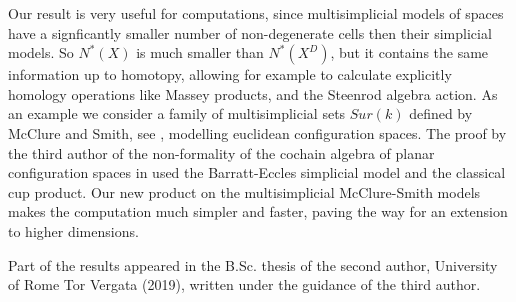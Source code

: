  Our result is very useful for computations, since multisimplicial models of spaces have a signficantly smaller number of non-degenerate cells then their simplicial models.
So $N^*(X)$ is much smaller than $N^*(X^D)$, but it contains the same information up to homotopy, 
allowing for example 
to calculate explicitly homology operations like Massey products, and the Steenrod algebra action. 
As an example we consider a family of multisimplicial sets $Sur(k)$ defined  by McClure and Smith, see \cite{MS},  modelling euclidean configuration spaces.
The proof by the third author of the non-formality of the cochain algebra of planar configuration spaces in \cite{formality}  used the Barratt-Eccles simplicial model and the classical cup product.
Our new product on the multisimplicial McClure-Smith models makes the computation much simpler and faster, paving the way for an extension to higher dimensions. 

\medskip

Part of the results appeared in the B.Sc. thesis of the second author, University of Rome Tor Vergata (2019), written under the guidance of the third author.